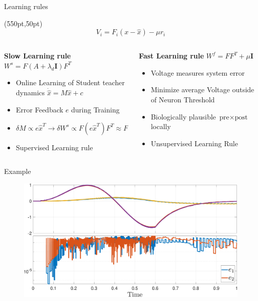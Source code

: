 \documentclass[17pt, t, lualatex]{beamer}
\begin{document}
\begin{frame}{Learning rules \cite{bourdoukan_enforcing_2015}}

	\begin{textblock*}{20pt}(550pt,50pt)
		\begin{equation*}
			V_i = F_i(x-\hat{x}) - \mu r_i
		\end{equation*}
	\end{textblock*}

	\begin{columns}
		\begin{column}{0.45\textwidth}
			\textbf{Slow Learning rule} $W^s = F(A+\lambda_d\mathbf{I})F^T$
			\begin{itemize}
				\item Online Learning of Student teacher dynamics $\dot{\hat{x}} = M\hat{x} +c$
				\item Error Feedback $e$ during Training
				\item $\delta M \propto e\hat{x}^T \longrightarrow \delta W^s \propto F(e\hat{x}^T)F^T \approx Fer^T$
				\item Supervised Learning rule
			\end{itemize}

		\end{column}
		\begin{column}{0.45\textwidth}
			\textbf{Fast Learning rule} $W^f = FF^T + \mu\mathbf{I}$
			\begin{itemize}
				\item Voltage measures system error
				\item Minimize average Voltage outside of Neuron Threshold
				\item Biologically plausible $\text{pre}\times\text{post}$ locally
				\item Unsupervised Learning Rule
			\end{itemize}
		\end{column}
	\end{columns}
\end{frame}


\begin{frame}{Example}
	\begin{figure}
		\includegraphics[scale = 0.45]{figures/plots/Learning/error_compare.pdf}
	\end{figure}
\end{frame}
\end{document}
